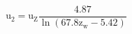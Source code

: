 \documentclass[12pt]{article}
\begin{document}
\begin{displaymath}
\mathrm{u}_{2}=\mathrm{u}_{\mathrm{Z}} \frac{4.87}{\ln \left(67.8 \mathrm{z}_{\mathrm{w}}-5.42\right)}
\end{displaymath}
\end{document}
